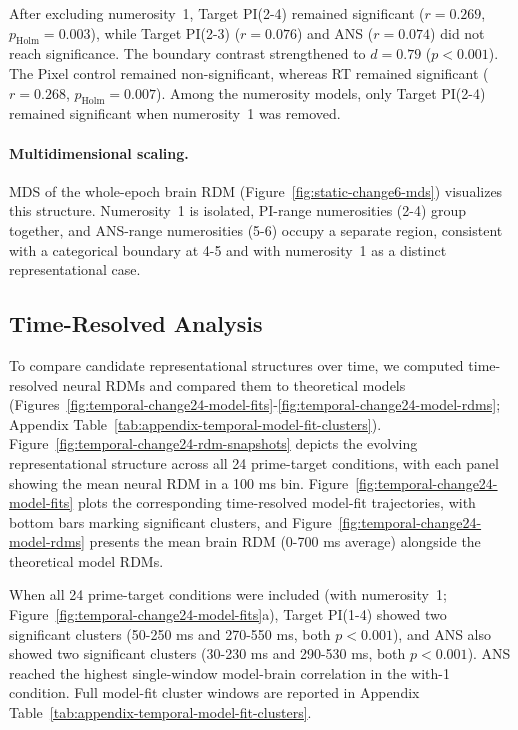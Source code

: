 After excluding numerosity~1, Target PI(2-4) remained significant ($r = 0.269$,
$p_{\text{Holm}} = 0.003$), while Target PI(2-3) ($r = 0.076$) and ANS
($r = 0.074$) did not reach significance. The boundary contrast strengthened to $d = 0.79$ ($p < 0.001$).
The Pixel control remained non-significant, whereas RT remained
significant ($r = 0.268$, $p_{\text{Holm}} = 0.007$).
Among the numerosity models, only Target PI(2-4) remained significant
when numerosity~1 was removed.

\paragraph{Multidimensional scaling.} MDS of the whole-epoch brain RDM
(Figure~\ref{fig:static-change6-mds}) visualizes this structure.
Numerosity~1 is isolated, PI-range
numerosities (2-4) group together, and ANS-range numerosities (5-6)
occupy a separate region, consistent with a categorical boundary at 4-5
and with numerosity~1 as a distinct representational case.



\subsection{Time-Resolved Analysis}



To compare candidate representational structures over time, we
computed time-resolved neural RDMs and compared them to theoretical
models (Figures~\ref{fig:temporal-change24-model-fits}-\ref{fig:temporal-change24-model-rdms};
Appendix Table~\ref{tab:appendix-temporal-model-fit-clusters}).
Figure~\ref{fig:temporal-change24-rdm-snapshots} depicts the evolving
representational structure across all 24 prime-target conditions, with
each panel showing the mean neural RDM in a 100 ms bin.
Figure~\ref{fig:temporal-change24-model-fits} plots the corresponding
time-resolved model-fit trajectories, with bottom bars marking
significant clusters, and
Figure~\ref{fig:temporal-change24-model-rdms} presents the mean brain RDM
(0-700 ms average) alongside the theoretical model RDMs.

When all 24 prime-target conditions were included (with numerosity~1;
Figure~\ref{fig:temporal-change24-model-fits}a), Target PI(1-4) showed
two significant clusters (50-250 ms and 270-550 ms, both $p < 0.001$),
and ANS also showed two significant clusters (30-230 ms and 290-530 ms,
both $p < 0.001$). ANS reached the highest single-window model-brain
correlation in the with-1 condition. Full model-fit cluster windows are
reported in Appendix Table~\ref{tab:appendix-temporal-model-fit-clusters}.

